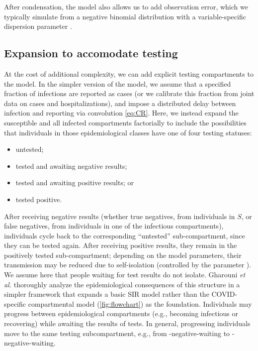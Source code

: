 \documentclass[12pt]{article}\usepackage[]{graphicx}\usepackage[]{color}
\begin{document}
After condensation, the model also allows us to add observation error, which we typically simulate from a negative binomial distribution with a variable-specific dispersion parameter \cite{linden2011using}.

\subsection*{Expansion to accomodate testing}

At the cost of additional complexity, we can add explicit testing compartments to the model.  In the simpler version of the model, we assume that a specified fraction of infections are reported as cases (or we calibrate this fraction from joint data on cases and hospitalizations), and impose a distributed delay between infection and reporting via convolution \eqref{eq:CR}.
Here, we instead expand the susceptible and all infected compartments factorially to include the possibilities that individuals in those epidemiological classes have one of four testing statuses:
\begin{itemize}
\item untested;
\item tested and awaiting negative results;
\item tested and awaiting positive results; or 
\item tested positive.
\end{itemize}
After receiving negative results (whether true negatives, from individuals in $S$, or false negatives, from individuals in one of the infectious compartments), individuals cycle back to the corresponding “untested” sub-compartment, since they can be tested again. After receiving positive results, they remain in the positively tested sub-compartment; depending on the model parameters, their transmission may be reduced due to self-isolation (controlled by the parameter ).  We assume here that people waiting for test results do not isolate.
Gharouni \emph{et al.}\/ \cite{Ghar+22} thoroughly analyze the epidemiological consequences of this structure in a simpler framework that expands a basic SIR model rather than the COVID-specific compartmental model (\cref{fig:flowchart}) as the foundation.
Individuals may progress between epidemiological compartments (e.g., becoming infectious or recovering) while awaiting the results of tests. In general, progressing individuals move to the same testing subcompartment, e.g., from -negative-waiting to -negative-waiting.
\end{document}
